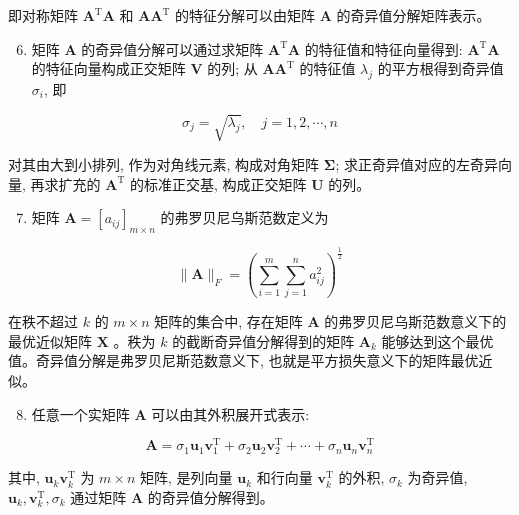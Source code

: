 \documentclass[10pt]{article}
\begin{document}
即对称矩阵 $\boldsymbol{A}^{\mathrm{T}} \boldsymbol{A}$ 和 $\boldsymbol{A} \boldsymbol{A}^{\mathrm{T}}$ 的特征分解可以由矩阵 $\boldsymbol{A}$ 的奇异值分解矩阵表示。

\begin{enumerate}
  \setcounter{enumi}{5}
  \item 矩阵 $\boldsymbol{A}$ 的奇异值分解可以通过求矩阵 $\boldsymbol{A}^{\mathrm{T}} \boldsymbol{A}$ 的特征值和特征向量得到: $\boldsymbol{A}^{\mathrm{T}} \boldsymbol{A}$ 的特征向量构成正交矩阵 $\boldsymbol{V}$ 的列; 从 $\boldsymbol{A} \boldsymbol{A}^{\mathrm{T}}$ 的特征值 $\lambda_{j}$ 的平方根得到奇异值 $\sigma_{i}$, 即
\end{enumerate}

$$
\sigma_{j}=\sqrt{\lambda_{j}}, \quad j=1,2, \cdots, n
$$

对其由大到小排列, 作为对角线元素, 构成对角矩阵 $\boldsymbol{\Sigma}$; 求正奇异值对应的左奇异向量, 再求扩充的 $\boldsymbol{A}^{\mathrm{T}}$ 的标准正交基, 构成正交矩阵 $\boldsymbol{U}$ 的列。

\begin{enumerate}
  \setcounter{enumi}{6}
  \item 矩阵 $\boldsymbol{A}=\left[a_{i j}\right]_{m \times n}$ 的弗罗贝尼乌斯范数定义为
\end{enumerate}

$$
\|\boldsymbol{A}\|_{F}=\left(\sum_{i=1}^{m} \sum_{j=1}^{n} a_{i j}^{2}\right)^{\frac{1}{2}}
$$

在秩不超过 $k$ 的 $m \times n$ 矩阵的集合中, 存在矩阵 $\boldsymbol{A}$ 的弗罗贝尼乌斯范数意义下的最优近似矩阵 $\boldsymbol{X}$ 。秩为 $k$ 的截断奇异值分解得到的矩阵 $\boldsymbol{A}_{k}$ 能够达到这个最优值。奇异值分解是弗罗贝尼斯范数意义下, 也就是平方损失意义下的矩阵最优近似。

\begin{enumerate}
  \setcounter{enumi}{7}
  \item 任意一个实矩阵 $\boldsymbol{A}$ 可以由其外积展开式表示:
\end{enumerate}

$$
\boldsymbol{A}=\sigma_{1} \boldsymbol{u}_{1} \boldsymbol{v}_{1}^{\mathrm{T}}+\sigma_{2} \boldsymbol{u}_{2} \boldsymbol{v}_{2}^{\mathrm{T}}+\cdots+\sigma_{n} \boldsymbol{u}_{n} \boldsymbol{v}_{n}^{\mathrm{T}}
$$

其中, $\boldsymbol{u}_{k} \boldsymbol{v}_{k}^{\mathrm{T}}$ 为 $m \times n$ 矩阵, 是列向量 $\boldsymbol{u}_{k}$ 和行向量 $\boldsymbol{v}_{k}^{\mathrm{T}}$ 的外积, $\sigma_{k}$ 为奇异值, $\boldsymbol{u}_{k}, \boldsymbol{v}_{k}^{\mathrm{T}}, \sigma_{k}$ 通过矩阵 $\boldsymbol{A}$ 的奇异值分解得到。
\end{document}
